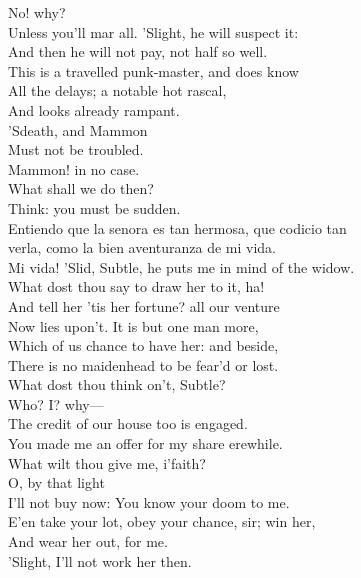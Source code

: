 \documentclass[a4paper,oneside]{memoir}
\begin{document}
\begin{drama*}
\subtlespeaks {} No! why?\\
\facespeaks Unless you'll mar all. 'Slight, he will suspect it:\\
And then he will not pay, not half so well.\\
This is a travelled punk-master, and does know\\
All the delays; a notable hot rascal,\\
And looks already rampant.\\
\subtlespeaks {} 'Sdeath, and Mammon\\
Must not be troubled.\\
\facespeaks {} Mammon! in no case.\\
\subtlespeaks What shall we do then?\\
\facespeaks {} Think: you must be sudden.\\
\surlyspeaks Entiendo que la senora es tan hermosa, que codicio tan\\
verla, como la bien aventuranza de mi vida.\\
\facespeaks Mi vida! 'Slid, Subtle, he puts me in mind of the widow.\\
What dost thou say to draw her to it, ha!\\
And tell her 'tis her fortune? all our venture\\
Now lies upon't. It is but one man more,\\
Which of us chance to have her: and beside,\\
There is no maidenhead to be fear'd or lost.\\
What dost thou think on't, Subtle?\\
\subtlespeaks {} Who? I? why---\\
\facespeaks The credit of our house too is engaged.\\
\subtlespeaks You made me an offer for my share erewhile.\\
What wilt thou give me, i'faith?\\
\facespeaks {} O, by that light\\
I'll not buy now: You know your doom to me.\\
E'en take your lot, obey your chance, sir; win her,\\
And wear her out, for me.\\
\subtlespeaks {} 'Slight, I'll not work her then.\\

\end{drama*}
\end{document}
